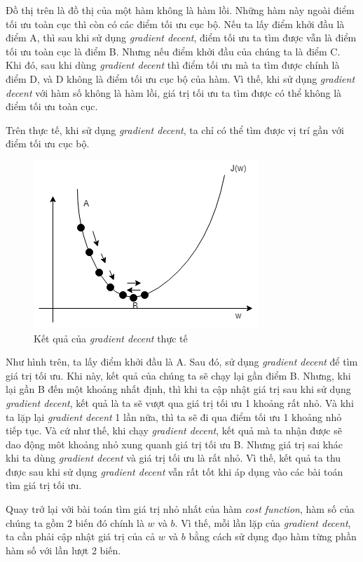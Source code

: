 Đồ thị trên là đồ thị của một hàm không là hàm lồi. Những hàm này ngoài điểm tối ưu toàn cục thì còn có các điểm tối ưu cục bộ. Nếu ta lấy điểm khởi đầu là điểm A, thì sau khi sử dụng \textit{gradient decent}, điểm tối ưu ta tìm được vẫn là điểm tối ưu toàn cục là điểm B. Nhưng nếu điểm khởi đầu của chúng ta là điểm C. Khi đó, sau khi dùng \textit{gradient decent} thì điểm tối ưu mà ta tìm được chính là điểm D, và D không là điểm tối ưu cục bộ của hàm. Vì thế, khi sử dụng \textit{gradient decent} với hàm số không là hàm lồi, giá trị tối ưu ta tìm được có thể không là điểm tối ưu toàn cục.

Trên thực tế, khi sử dụng \textit{gradient decent}, ta chỉ có thể tìm được vị trí gần với điểm tối ưu cục bộ.

\clearpage
\begin{figure}[!h]
\centerline{\includegraphics{books/artificial-neural-network/chapter02/figure/grad_6.png}}
\caption{Kết quả của \textit{gradient decent} thực tế}
\label{fig:grad_6}
\end{figure}

Như hình trên, ta lấy điểm khởi đầu là A. Sau đó, sử dụng \textit{gradient decent} để tìm giá trị tối ưu. Khi này, kết quả của chúng ta sẽ chạy lại gần điểm B. Nhưng, khi lại gần B đến một khoảng nhất định, thì khi ta cập nhật giá trị sau khi sử dụng \textit{gradient decent}, kết quả là ta sẽ vượt qua giá trị tối ưu 1 khoảng rất nhỏ. Và khi ta lặp lại \textit{gradient decent} 1 lần nữa, thì ta sẽ đi qua điểm tối ưu 1 khoảng nhỏ tiếp tục. Và cứ như thế, khi chạy \textit{gradient decent}, kết quả mà ta nhận được sẽ dao động môt khoảng nhỏ xung quanh giá trị tối ưu B. Nhưng giá trị sai khác khi ta dùng \textit{gradient decent} và giá trị tối ưu là rất nhỏ. Vì thế, kết quả ta thu được sau khi sử dụng \textit{gradient decent} vẫn rất tốt khi áp dụng vào các bài toán tìm giá trị tối ưu.

Quay trở lại với bài toán tìm giá trị nhỏ nhất của hàm \textit{cost function}, hàm số của chúng ta gồm 2 biến đó chính là $w$ và $b$. Vì thế, mỗi lần lặp của \textit{gradient decent}, ta cần phải cập nhật giá trị của cả $w$ và $b$ bằng cách sử dụng đạo hàm từng phần hàm số với lần lượt 2 biến.

